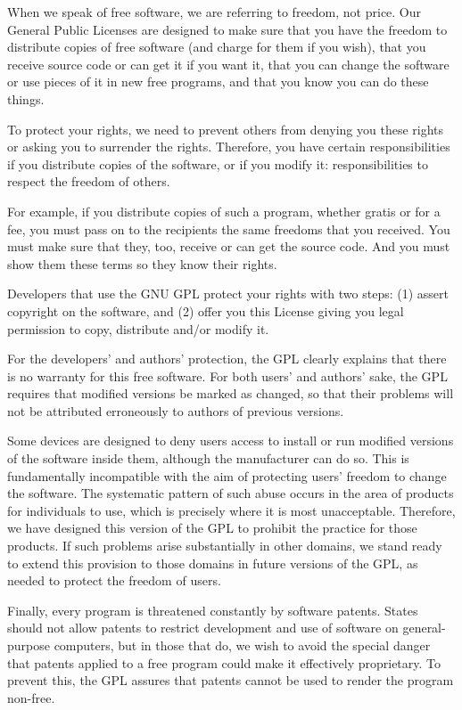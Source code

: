 When we speak of free software, we are referring to freedom, not
price.  Our General Public Licenses are designed to make sure that you
have the freedom to distribute copies of free software (and charge for
them if you wish), that you receive source code or can get it if you
want it, that you can change the software or use pieces of it in new
free programs, and that you know you can do these things.

To protect your rights, we need to prevent others from denying you
these rights or asking you to surrender the rights.  Therefore, you have
certain responsibilities if you distribute copies of the software, or if
you modify it: responsibilities to respect the freedom of others.

For example, if you distribute copies of such a program, whether
gratis or for a fee, you must pass on to the recipients the same
freedoms that you received.  You must make sure that they, too, receive
or can get the source code.  And you must show them these terms so they
know their rights.

Developers that use the GNU GPL protect your rights with two steps:
(1) assert copyright on the software, and (2) offer you this License
giving you legal permission to copy, distribute and/or modify it.

For the developers' and authors' protection, the GPL clearly explains
that there is no warranty for this free software.  For both users' and
authors' sake, the GPL requires that modified versions be marked as
changed, so that their problems will not be attributed erroneously to
authors of previous versions.

Some devices are designed to deny users access to install or run
modified versions of the software inside them, although the manufacturer
can do so.  This is fundamentally incompatible with the aim of
protecting users' freedom to change the software.  The systematic
pattern of such abuse occurs in the area of products for individuals to
use, which is precisely where it is most unacceptable.  Therefore, we
have designed this version of the GPL to prohibit the practice for those
products.  If such problems arise substantially in other domains, we
stand ready to extend this provision to those domains in future versions
of the GPL, as needed to protect the freedom of users.

Finally, every program is threatened constantly by software patents.
States should not allow patents to restrict development and use of
software on general-purpose computers, but in those that do, we wish to
avoid the special danger that patents applied to a free program could
make it effectively proprietary.  To prevent this, the GPL assures that
patents cannot be used to render the program non-free.


